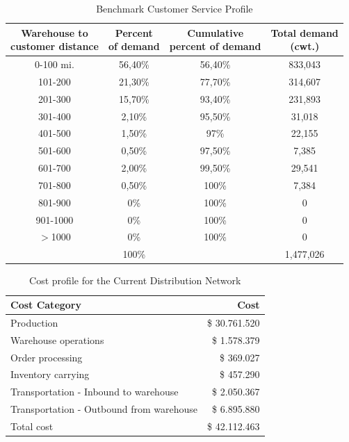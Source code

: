 \documentclass[12pt,a4paper]{article}
\begin{document}
\begin{table}[!h]
    \caption{Benchmark Customer Service Profile}
    \centering
    \label{tab:table4-enunciado}
    \begin{tabular}{|c|c|c|c|}
    \hline
    \makecell{\textbf{Warehouse to} \\ \textbf{customer distance}} &
    \makecell{\textbf{Percent} \\ \textbf{of demand}} &
    \makecell{\textbf{Cumulative} \\ \textbf{percent of demand}} &
    \makecell{\textbf{Total demand} \\ \textbf{(cwt.)}} \\
    \hline
    0-100 mi.    & 56,40\% & 56,40\% & 833,043 \\
    101-200      & 21,30\% & 77,70\% & 314,607 \\
    201-300      & 15,70\% & 93,40\% & 231,893 \\
    301-400      & 2,10\%  & 95,50\% & 31,018  \\
    401-500      & 1,50\%  & 97\%    & 22,155  \\
    501-600      & 0,50\%  & 97,50\% & 7,385   \\
    601-700      & 2,00\%  & 99,50\% & 29,541  \\
    701-800      & 0,50\%  & 100\%   & 7,384   \\
    801-900      & 0\%     & 100\%   & 0       \\
    901-1000     & 0\%     & 100\%   & 0       \\
    $>$1000       & 0\%     & 100\%   & 0       \\
                  & 100\%   &         & 1,477,026 \\
    \hline
    \end{tabular}
\end{table}

\begin{table}[!h]
    \caption{Cost profile for the Current Distribution Network}
    \label{tab:table5-enunciado}
    \centering
    \begin{tabular}{|l|r|}
    \hline
    \textbf{Cost Category}                   & \textbf{Cost} \\
    \hline
    Production                               & \$ 30.761.520 \\
    Warehouse operations                     & \$  1.578.379 \\
    Order processing                         & \$    369.027 \\
    Inventory carrying                       & \$    457.290 \\
    Transportation - Inbound to warehouse    & \$  2.050.367 \\
    Transportation - Outbound from warehouse & \$  6.895.880 \\
    Total cost                               & \$ 42.112.463 \\
    \hline
\end{tabular}
\end{table}
\end{document}
